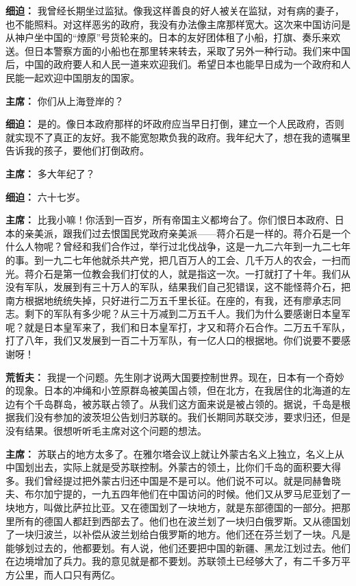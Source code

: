 \begin{list}{}
\item[\textbf{细迫：}] 我曾经长期坐过监狱。像我这样善良的好人被关在监狱，对有病的妻子，也不能照料。对这样恶劣的政府，我没有办法像主席那样宽大。这次来中国访问是从神户坐中国的“燎原”号货轮来的。日本的友好团体租了小船，打旗、奏乐来欢送。但日本警察方面的小船也在那里转来转去，采取了另外一种行动。我们来中国后，中国的政府要人和人民一道来欢迎我们。希望日本也能早日成为一个政府和人民能一起欢迎中国朋友的国家。

\item[\textbf{主席：}] 你们从上海登岸的？

\item[\textbf{细迫：}] 是的。像日本政府那样的坏政府应当早日打倒，建立一个人民政府，否则就实现不了真正的友好。我不能宽恕欺负我的政府。我年纪大了，想在我的遗嘱里告诉我的孩子，要他们打倒政府。

\item[\textbf{主席：}] 多大年纪了？

\item[\textbf{细迫：}] 六十七岁。

\item[\textbf{主席：}] 比我小嘛！你活到一百岁，所有帝国主义都垮台了。你们恨日本政府、日本的亲美派，跟我们过去恨国民党政府亲美派——蒋介石是一样的。蒋介石是一个什么人物呢？曾经和我们合作过，举行过北伐战争，这是一九二六年到一九二七年的事。到一九二七年他就杀共产党，把几百万人的工会、几千万人的农会，一扫而光。蒋介石是第一位教会我们打仗的人，就是指这一次。一打就打了十年。我们从没有军队，发展到有三十万人的军队，结果我们自己犯错误，这不能怪蒋介石，把南方根据地统统失掉，只好进行二万五千里长征。在座的，有我，还有廖承志同志。剩下的军队有多少呢？从三十万减到二万五千人。我们为什么要感谢日本皇军呢？就是日本皇军来了，我们和日本皇军打，才又和蒋介石合作。二万五千军队，打了八年，我们又发展到一百二十万军队，有一亿人口的根据地。你们说要不要感谢呀！

\item[\textbf{荒哲夫：}] 我提一个问题。先生刚才说两大国要控制世界。现在，日本有一个奇妙的现象。日本的冲绳和小笠原群岛被美国占领，但在北方，在我居住的北海道的左边有个千岛群岛，被苏联占领了。从我们这方面来说是被占领的。据说，千岛是根据我们没有参加的波茨坦公告划归苏联的。我们长期同苏联交涉，要求归还，但是没有结果。很想听听毛主席对这个问题的想法。

\item[\textbf{主席：}] 苏联占的地方太多了。在雅尔塔会议上就让外蒙古名义上独立，名义上从中国划出去，实际上就是受苏联控制。外蒙古的领土，比你们千岛的面积要大得多。我们曾经提过把外蒙古归还中国是不是可以。他们说不可以。就是同赫鲁晓夫、布尔加宁提的，一九五四年他们在中国访问的时候。他们又从罗马尼亚划了一块地方，叫做比萨拉比亚。又在德国划了一块地方，就是东部德国的一部分。把那里所有的德国人都赶到西部去了。他们也在波兰划了一块归白俄罗斯。又从德国划了一块归波兰，以补偿从波兰划给白俄罗斯的地方。他们还在芬兰划了一块。凡是能够划过去的，他都要划。有人说，他们还要把中国的新疆、黑龙江划过去。他们在边境增加了兵力。我的意见就是都不要划。苏联领土已经够大了，有二千多万平方公里，而人口只有两亿。


\end{list}
